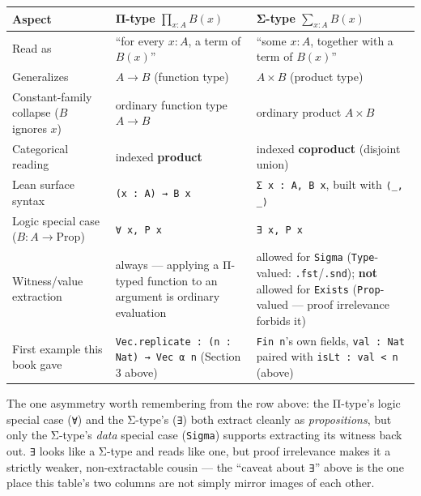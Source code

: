 \begin{longtable}[]{@{}
  >{\raggedright\arraybackslash}p{}
  >{\raggedright\arraybackslash}p{}
  >{\raggedright\arraybackslash}p{}@{}}
\toprule\noalign{}
\begin{minipage}[b]{\linewidth}\raggedright
Aspect
\end{minipage} & \begin{minipage}[b]{\linewidth}\raggedright
Π-type \(\prod_{x:A} B(x)\)
\end{minipage} & \begin{minipage}[b]{\linewidth}\raggedright
Σ-type \(\sum_{x:A} B(x)\)
\end{minipage} \\
\midrule\noalign{}
\endhead
\bottomrule\noalign{}
\endlastfoot
Read as & ``for every \(x:A\), a term of \(B(x)\)'' & ``some \(x:A\), together with a term of \(B(x)\)'' \\
Generalizes & \(A \to B\) (function type) & \(A \times B\) (product type) \\
Constant-family collapse (\(B\) ignores \(x\)) & ordinary function type \(A \to B\) & ordinary product \(A \times B\) \\
Categorical reading & indexed \textbf{product} & indexed \textbf{coproduct} (disjoint union) \\
Lean surface syntax & \texttt{(x : A) → B x} & \texttt{Σ x : A, B x}, built with \texttt{⟨\_\allowbreak{}, \_\allowbreak{}⟩} \\
Logic special case (\(B : A \to \mathrm{Prop}\)) & \texttt{∀ x, P x} & \texttt{∃ x, P x} \\
Witness/value extraction & always --- applying a Π-typed function to an argument is ordinary evaluation & allowed for \texttt{Sigma} (\texttt{Type}-valued: \texttt{.fst}/\texttt{.snd}); \textbf{not} allowed for \texttt{Exists} (\texttt{Prop}-valued --- proof irrelevance forbids it) \\
First example this book gave & \texttt{Vec.replicate : (n : Nat) → Vec α n} (Section 3 above) & \texttt{Fin n}'s own fields, \texttt{val : Nat} paired with \texttt{isLt : val < n} (above) \\
\end{longtable}

The one asymmetry worth remembering from the row above: the Π-type's logic special case (\texttt{∀}) and the Σ-type's (\texttt{∃}) both extract cleanly as \emph{propositions}, but only the Σ-type's \emph{data} special case (\texttt{Sigma}) supports extracting its witness back out. \texttt{∃} looks like a Σ-type and reads like one, but proof irrelevance makes it a strictly weaker, non-extractable cousin --- the ``caveat about \texttt{∃}'' above is the one place this table's two columns are not simply mirror images of each other.

